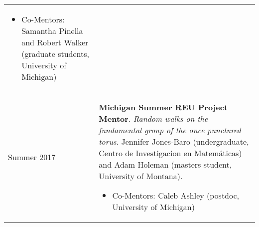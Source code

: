 \begin{center}
{\begin{longtable}{p{}  p{}}
        {\small
        \begin{itemize}
        \setlength{\parindent}{0em}
        \item[] 
            Co-Mentors: Samantha Pinella and Robert Walker (graduate students, University of Michigan) 
        \end{itemize}
        }
        \vspace{-1em}
         \\ 
  Summer 2017 & \textbf{Michigan Summer REU  Project Mentor}. \textit{Random walks on the fundamental group of the once punctured torus}.  Jennifer Jones-Baro (undergraduate, Centro de Investigacion en Matem\'aticas) and Adam Holeman (masters student, University of Montana). 
        \hspace{-1em}

        {\small
        \begin{itemize}
        \setlength{\parindent}{0em}
        \item[] 
            Co-Mentors: Caleb Ashley (postdoc, University of Michigan) 
        \end{itemize}
        }
        \vspace{-1em}
         
    \end{longtable}
    } 
    \end{center}

    \vspace{-1em}
    